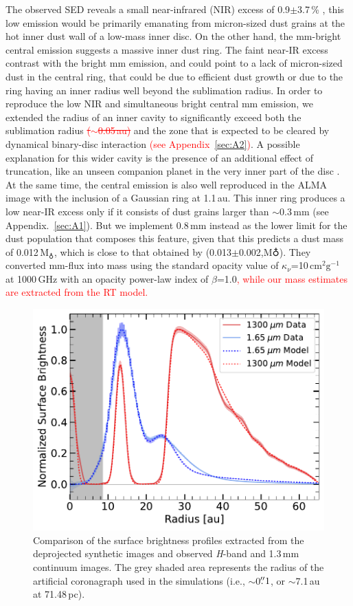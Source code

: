\documentclass[fleqn,usenatbib,useAMS]{mnras}
\newcommand{\red}[1]{\textcolor{red}{#1}}
\begin{document}
The observed SED reveals a small near-infrared (NIR) excess of 0.9$\pm$3.7\,\% \citep{Francis_2020}, this low emission would be primarily emanating from micron-sized dust grains at the hot inner dust wall of a low-mass inner disc. On the other hand, the mm-bright central emission suggests a massive inner dust ring. The faint near-IR excess contrast with the bright mm emission, and could point to a lack of micron-sized dust in the central ring, that could be due to efficient dust growth or due to the ring having an inner radius well beyond the sublimation radius. In order to reproduce the low NIR and simultaneous bright central mm emission, we extended the radius of an inner cavity to significantly exceed both the sublimation radius \red{\sout{($\sim$0.05\,au)}} and the zone that is expected to be cleared by dynamical binary-disc interaction \red{\sout{\citep[][$\lesssim$0.1\,au]{Art_Lu}} (see Appendix~\ref{sec:A2})}. A possible explanation for this wider cavity is the presence of an additional effect of truncation, like an unseen companion planet in the very inner part of the disc \citep{Francis_2020}. At the same time, the central emission is also well reproduced in the ALMA image with the inclusion of a Gaussian ring at 1.1\,au. This inner ring produces a low near-IR excess only if it consists of dust grains larger than $\sim$0.3\,mm (see Appendix.~\ref{sec:A1}). But we implement 0.8\,mm instead as the lower limit for the dust population that composes this feature, given that this predicts a dust mass of 0.012\,M$_{\earth}$, which is close to that obtained by \citet{Francis_2020} (0.013$\pm$0.002,M${\earth}$). They converted mm-flux into mass using the standard opacity value of $\kappa_{\nu}$=10\,$\mathrm{cm}^2 \mathrm{g}^{-1}$ at 1000\,GHz with an opacity power-law index of $\beta$=1.0\red{, while our mass estimates are  extracted from the RT model.}
\begin{figure}
	\includegraphics[width=\columnwidth]{comp_fig_all_profiles_au.pdf}
    \caption{Comparison of the surface brightness profiles extracted from the deprojected synthetic images and observed \textit{H}-band and 1.3\,mm continuum images. The grey shaded area represents the radius of the artificial coronagraph used in the simulations (i.e., $\sim$0$\hbox{$.\!\!^{\prime\prime}$} 1$, or $\sim$7.1\,au at 71.48\,pc).}
    \label{fig:radprofiles}
\end{figure}
\end{document}

